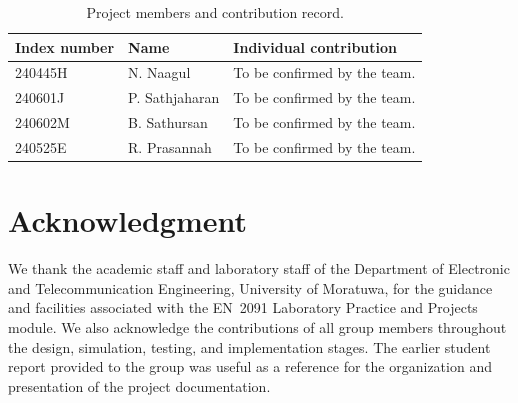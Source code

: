 \documentclass[11pt,a4paper]{article}
\begin{document}
\begin{table}[htbp]
\centering\small
\caption{Project members and contribution record.}
\begin{tabularx}{\textwidth}{llY}
\toprule
\textbf{Index number} & \textbf{Name} & \textbf{Individual contribution}\\
\midrule
240445H & N. Naagul & To be confirmed by the team.\\
240601J & P. Sathjaharan & To be confirmed by the team.\\
240602M & B. Sathursan & To be confirmed by the team.\\
240525E & R. Prasannah & To be confirmed by the team.\\
\bottomrule
\end{tabularx}
\end{table}

\section*{Acknowledgment}
We thank the academic staff and laboratory staff of the Department of Electronic and Telecommunication Engineering, University of Moratuwa, for the guidance and facilities associated with the EN~2091 Laboratory Practice and Projects module. We also acknowledge the contributions of all group members throughout the design, simulation, testing, and implementation stages. The earlier student report provided to the group was useful as a reference for the organization and presentation of the project documentation.
\end{document}
